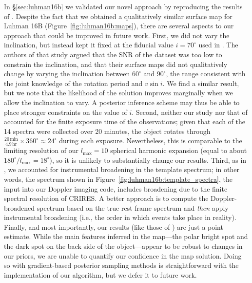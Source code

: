 \documentclass[modern]{aastex631}
\begin{document}
In \S\ref{sec:luhman16b} we validated our novel approach by reproducing the results of \citet{Crossfield2014}. 
Despite the fact that we obtained a qualitatively similar surface map for Luhman 16B (Figure~\ref{fig:luhman16b:maps}), there are several aspects to our approach that could be improved in future work. 
%
First, we did not vary the inclination, but instead kept it fixed at the fiducial value $i = 70^\circ$ used in \citet{Crossfield2014}. 
The authors of that study argued that the SNR of the dataset was too low to constrain the inclination, and that their surface maps did not qualitatively change by varying the inclination between $60^\circ$ and $90^\circ$, the range consistent with the joint knowledge of the rotation period and $v\sin i$. 
We find a similar result, but we note that the likelihood of the solution improves marginally when we allow the inclination to vary.
A posterior inference scheme may thus be able to place stronger constraints on the value of $i$.
%
Second, neither our study nor that of \citet{Crossfield2014} accounted for the finite exposure time of the observations; given that each of the 14 spectra were collected over 20 minutes, the object rotates through $\frac{20\,\mathrm{min}}{4.9\,\mathrm{hr}}\times 360^\circ \approx 24^\circ$ during each exposure.
Nevertheless, this is comparable to the limiting resolution of our $l_\mathrm{max} = 10$ spherical harmonic expansion (equal to about $180^\circ / l_\mathrm{max} = 18^\circ$), so it is unlikely to substantially change our results.
%
Third, as in \citet{Crossfield2014}, we accounted for instrumental broadening in the template spectrum; in other words, the spectrum shown in Figure~\ref{fig:luhman16b:template_spectra}, the input into our Doppler imaging code, includes broadening due to the finite spectral resolution of CRIRES.
A better approach is to compute the Doppler-broadened spectrum based on the true rest frame spectrum and \emph{then} apply instrumental broadening (i.e., the order in which events take place in reality).
%
Finally, and most importantly, our results (like those of \citet{Crossfield2014}) are just a point estimate.
While the main features inferred in the map---the polar bright spot and the dark spot on the back side of the object---appear to be robust to changes in our priors, we are unable to quantify our confidence in the map solution.
%
Doing so with gradient-based posterior sampling methods is straightforward with the \starry implementation of our algorithm, but we defer it to future work.
\end{document}
